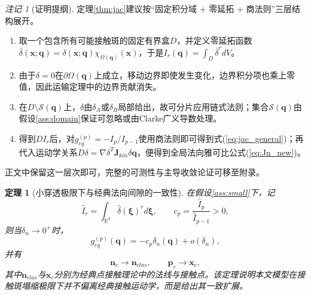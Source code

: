 ﻿\documentclass[12pt, a4paper]{ctexart}
\theoremstyle{plain}
\newtheorem{theorem}{定理}
\theoremstyle{remark}
\newtheorem{remark}{注记}
\begin{document}
\begin{remark}[证明提纲]
定理\ref{thm:jac}建议按“固定积分域 + 零延拓 + 商法则”三层结构展开。
\begin{enumerate}
    \item 取一个包含所有可能接触斑的固定有界盒$D$，并定义零延拓函数$\bar{\delta}(\bm{x};\bm{q}) = \delta(\bm{x};\bm{q}) \chi_{\Omega(\bm{q})}(\bm{x})$，于是$I_r(\bm{q}) = \int_D \bar{\delta}^r dV$。
    \item 由于$\delta = 0$在$\partial \Omega(\bm{q})$上成立，移动边界即使发生变化，边界积分项也乘上零值，因此运输定理中的边界贡献消失。
    \item 在$D \setminus \mathcal{S}(\bm{q})$上，$\delta$由$\delta_A$或$\delta_B$局部给出，故可分片应用链式法则；集合$\mathcal{S}(\bm{q})$由假设\ref{ass:domain}保证可忽略或由Clarke广义导数处理。
    \item 得到$D I_r$后，对$g_{eq}^{(p)} = -I_p/I_{p-1}$使用商法则即可得到式(\ref{eq:jac_general})；再代入运动学关系$D\delta = \nabla \delta^T \bm{J}_{kin}\delta \bm{q}$，便得到全局法向雅可比公式(\ref{eq:Jn_new})。
\end{enumerate}
正文中保留这一层次即可，完整的可测性与主导收敛论证可移至附录。
\end{remark}

\begin{theorem}[小穿透极限下与经典法向间隙的一致性]\label{thm:consistency}
在假设\ref{ass:small}下，记
\begin{equation}
    \hat{I}_r = \int_{\mathbb{R}^3} \hat{\delta}(\bm{\xi})^r d\bm{\xi},
    \qquad
    c_p = \frac{\hat{I}_p}{\hat{I}_{p-1}} > 0,
\end{equation}
则当$\delta_n \to 0^+$时，
\begin{equation}
    g_{eq}^{(p)}(\bm{q}) = - c_p \delta_n(\bm{q}) + o(\delta_n),
\end{equation}
并有
\begin{equation}
    \bm{n}_c \to \bm{n}_{clas}, \qquad \bm{p}_c \to \bm{x}_c,
\end{equation}
其中$\bm{n}_{clas}$与$\bm{x}_c$分别为经典点接触理论中的法线与接触点。该定理说明本文模型在接触斑塌缩极限下并不偏离经典接触运动学，而是给出其一致扩展。
\end{theorem}
\end{document}
